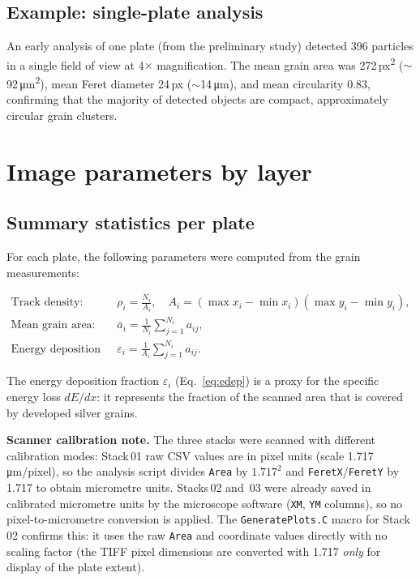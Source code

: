 \documentclass[12pt,a4paper]{article}
\begin{document}
\subsection{Example: single-plate analysis}

An early analysis of one plate (from the preliminary study) detected
396 particles in a single field of view at 4$\times$ magnification.
The mean grain area was 272\,px\textsuperscript{2}
($\sim$92\,\si{\micro\meter\squared}), mean Feret diameter 24\,px
($\sim$14\,\si{\micro\meter}), and mean circularity 0.83, confirming that the
majority of detected objects are compact, approximately circular grain
clusters.

\section{Image parameters by layer}
\label{sec:params}

\subsection{Summary statistics per plate}

For each plate, the following parameters were computed from the grain
measurements:

\begin{align}
\text{Track density:}\quad &
\rho_i = \frac{N_i}{A_i}, \quad
A_i = (\max x_i - \min x_i)(\max y_i - \min y_i), \label{eq:density}\\
\text{Mean grain area:}\quad &
\bar{a}_i = \frac{1}{N_i}\sum_{j=1}^{N_i} a_{ij}, \label{eq:meanarea}\\
\text{Energy deposition fraction:}\quad &
\varepsilon_i = \frac{1}{A_i}\sum_{j=1}^{N_i} a_{ij}. \label{eq:edep}
\end{align}

The energy deposition fraction $\varepsilon_i$ (Eq.~\ref{eq:edep}) is a
proxy for the specific energy loss $dE/dx$: it represents the
fraction of the scanned area that is covered by developed silver
grains.

\noindent\textbf{Scanner calibration note.}
The three stacks were scanned with different calibration modes:
Stack\,01 raw CSV values are in pixel units (scale
1.717\,\si{\micro\meter}/pixel), so the analysis script divides
\texttt{Area} by $1.717^2$ and \texttt{FeretX}/\texttt{FeretY} by
1.717 to obtain micrometre units.
Stacks\,02 and~03 were already saved in calibrated micrometre units by
the microscope software (\texttt{XM}, \texttt{YM} columns), so no
pixel-to-micrometre conversion is applied.
The \texttt{GeneratePlots.C} macro for Stack\,02 confirms this: it
uses the raw \texttt{Area} and coordinate values directly with no
scaling factor (the TIFF pixel dimensions are converted with 1.717
\emph{only} for display of the plate extent).
\end{document}
